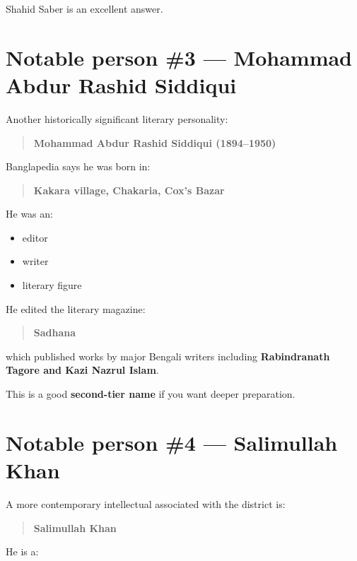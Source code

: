 Shahid Saber is an excellent answer.

\medskip

\section{Notable person \#3 --- Mohammad Abdur Rashid Siddiqui}

Another historically significant literary personality:

\begin{quote}
\textbf{Mohammad Abdur Rashid Siddiqui (1894--1950)}\\
\end{quote}

Banglapedia says he was born in:

\begin{quote}
\textbf{Kakara village, Chakaria, Cox's Bazar}\\
\end{quote}

He was an:

\begin{itemize}
  \item editor
  \item writer
  \item literary figure
\end{itemize}

He edited the literary magazine:

\begin{quote}
\textbf{Sadhana}\\
\end{quote}

which published works by major Bengali writers including \textbf{Rabindranath Tagore and Kazi Nazrul Islam}.

This is a good \textbf{second-tier name} if you want deeper preparation.

\medskip

\section{Notable person \#4 --- Salimullah Khan}

A more contemporary intellectual associated with the district is:

\begin{quote}
\textbf{Salimullah Khan}\\
\end{quote}

He is a:

